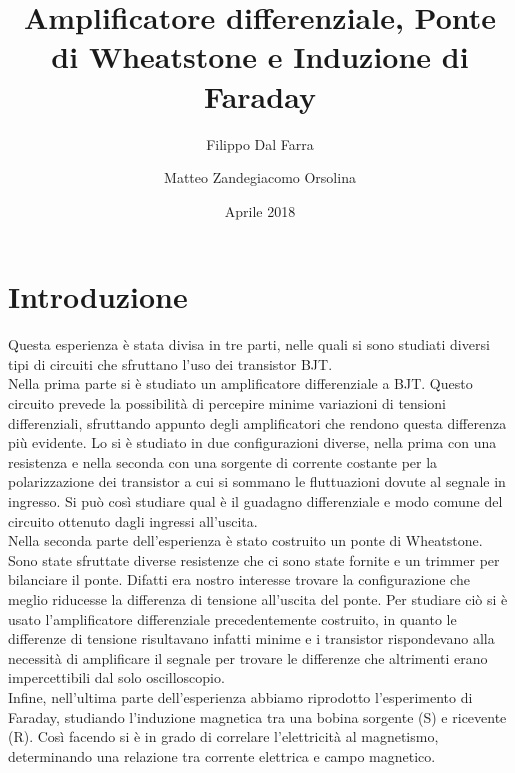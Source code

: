 \documentclass{article}
\title{Amplificatore differenziale, Ponte di Wheatstone e Induzione di Faraday}
\author{Filippo Dal Farra \and Matteo Zandegiacomo Orsolina}
\date{Aprile 2018}
\begin{document}
\maketitle

\newpage

\section{Introduzione}
Questa esperienza è stata divisa in tre parti, nelle quali si sono studiati diversi tipi di circuiti che sfruttano l'uso dei transistor BJT.\\
Nella prima parte si è studiato un amplificatore differenziale a BJT. Questo circuito prevede la possibilità di percepire minime variazioni di tensioni differenziali, sfruttando appunto degli amplificatori che rendono questa differenza più evidente. Lo si è studiato in due configurazioni diverse, nella prima con una resistenza e nella seconda con una sorgente di corrente costante per la polarizzazione dei transistor a cui si sommano le fluttuazioni dovute al segnale in ingresso. Si può così studiare qual è il guadagno differenziale e modo comune del circuito ottenuto dagli ingressi all'uscita.\\

Nella seconda parte dell'esperienza è stato costruito un ponte di Wheatstone. Sono state sfruttate diverse resistenze che ci sono state fornite e un trimmer per bilanciare il ponte. Difatti era nostro interesse trovare la configurazione che meglio riducesse la differenza di tensione all'uscita del ponte. Per studiare ciò si è usato l'amplificatore differenziale precedentemente costruito, in quanto le differenze di tensione risultavano infatti minime e i transistor rispondevano alla necessità di amplificare il segnale per trovare le differenze che altrimenti erano impercettibili dal solo oscilloscopio. \\

Infine, nell'ultima parte dell'esperienza abbiamo riprodotto l'esperimento di Faraday, studiando l'induzione magnetica tra una bobina sorgente (S) e ricevente (R). Così facendo si è in grado di correlare l'elettricità al magnetismo, determinando una relazione tra corrente elettrica e campo magnetico.\\
\end{document}
